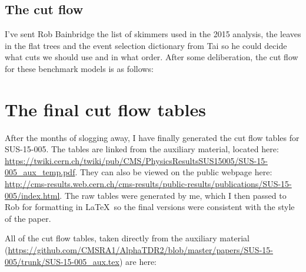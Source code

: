 \subsection{The cut flow}

I've sent Rob Bainbridge the list of skimmers used in the 2015 analysis, the leaves in the flat trees and the event selection dictionary from Tai so he could decide what cuts we should use and in what order. After some deliberation, the cut flow for these benchmark models is as follows:




\section{The final cut flow tables}

After the months of slogging away, I have finally generated the cut flow tables for SUS-15-005. The tables are linked from the auxiliary material, located here: \sloppy\url{https://twiki.cern.ch/twiki/pub/CMS/PhysicsResultsSUS15005/SUS-15-005_aux_temp.pdf}. They can also be viewed on the public webpage here: \url{http://cms-results.web.cern.ch/cms-results/public-results/publications/SUS-15-005/index.html}. The raw tables were generated by me, which I then passed to Rob for formatting in \LaTeX\ so the final versions were consistent with the style of the paper.

All of the cut flow tables, taken directly from the auxiliary material (\sloppy\url{https://github.com/CMSRA1/AlphaTDR2/blob/master/papers/SUS-15-005/trunk/SUS-15-005_aux.tex}) are here:

